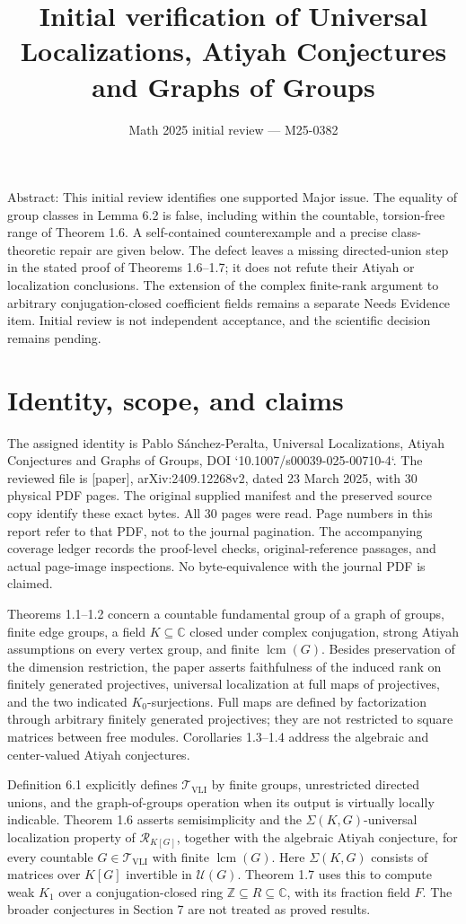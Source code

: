 \documentclass[10pt]{article}
\title{Initial verification of
Universal Localizations, Atiyah Conjectures
and Graphs of Groups}
\author{}
\date{Math 2025 initial review — M25-0382}
\begin{document}
\maketitle
Abstract: This initial review identifies one supported Major issue. The equality of group classes in Lemma 6.2 is false, including within the countable, torsion-free range of Theorem 1.6. A self-contained counterexample and a precise class-theoretic repair are given below. The defect leaves a missing directed-union step in the stated proof of Theorems 1.6–1.7; it does not refute their Atiyah or localization conclusions. The extension of the complex finite-rank argument to arbitrary conjugation-closed coefficient fields remains a separate Needs Evidence item. Initial review is not independent acceptance, and the scientific decision remains pending.\par
\section*{Identity, scope, and claims}
The assigned identity is Pablo Sánchez-Peralta, Universal Localizations, Atiyah Conjectures and Graphs of Groups, DOI `10.1007/s00039-025-00710-4`. The reviewed file is [paper], arXiv:2409.12268v2, dated 23 March 2025, with 30 physical PDF pages. The original supplied manifest and the preserved source copy identify these exact bytes. All 30 pages were read. Page numbers in this report refer to that PDF, not to the journal pagination. The accompanying coverage ledger records the proof-level checks, original-reference passages, and actual page-image inspections. No byte-equivalence with the journal PDF is claimed.\par
Theorems 1.1–1.2 concern a countable fundamental group of a graph of groups, finite edge groups, a field \(K\subseteq\mathbb C\) closed under complex conjugation, strong Atiyah assumptions on every vertex group, and finite \(\operatorname{lcm}(G)\). Besides preservation of the dimension restriction, the paper asserts faithfulness of the induced rank on finitely generated projectives, universal localization at full maps of projectives, and the two indicated \(K_0\)-surjections. Full maps are defined by factorization through arbitrary finitely generated projectives; they are not restricted to square matrices between free modules. Corollaries 1.3–1.4 address the algebraic and center-valued Atiyah conjectures.\par
Definition 6.1 explicitly defines \(\mathcal T_{\mathrm{VLI}}\) by finite groups, unrestricted directed unions, and the graph-of-groups operation when its output is virtually locally indicable. Theorem 1.6 asserts semisimplicity and the \(\Sigma(K,G)\)-universal localization property of \(\mathcal R_{K[G]}\), together with the algebraic Atiyah conjecture, for every countable \(G\in\mathcal T_{\mathrm{VLI}}\) with finite \(\operatorname{lcm}(G)\). Here \(\Sigma(K,G)\) consists of matrices over \(K[G]\) invertible in \(\mathcal U(G)\). Theorem 1.7 uses this to compute weak \(K_1\) over a conjugation-closed ring \(\mathbb Z\subseteq R\subseteq\mathbb C\), with its fraction field \(F\). The broader conjectures in Section 7 are not treated as proved results.\par
\end{document}
